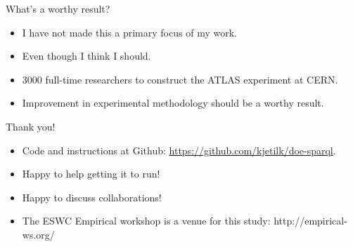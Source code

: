 \documentclass[english,usenames,dvipsnames,aspectratio=169]{beamer}
\begin{document}
\begin{frame}{What's a worthy result?}
  \begin{itemize}
  \item I have not made this a primary focus of my work.
  \item Even though I think I should.
  \item 3000 full-time researchers to construct the ATLAS experiment
    at CERN.
  \item Improvement in experimental methodology should be a worthy result.
  \end{itemize}


\end{frame}

\begin{frame}{Thank you!}

  \begin{itemize}
  \item Code and instructions at Github:
    \url{https://github.com/kjetilk/doe-sparql}.
  \item Happy to help getting it to run!
  \item Happy to discuss collaborations!
  \item The ESWC Empirical workshop is a venue for this study: http://empirical-ws.org/
  \end{itemize}

\end{frame}
\end{document}

